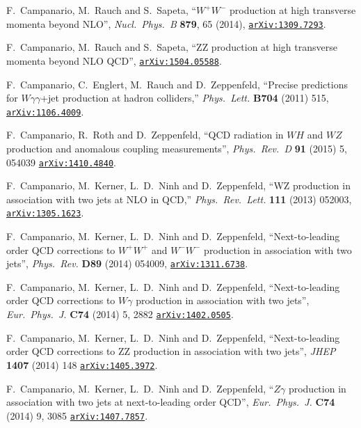 \documentclass[english,12pt]{article}
\begin{document}
\begin{thebibliography}{10}
  F.~Campanario, M.~Rauch and S.~Sapeta,
  ``$W^+W^-$ production at high transverse momenta beyond NLO'',
  {\em Nucl.\ Phys.\ B} {\bf 879}, 65 (2014),
\href{http://www.arXiv.org/abs/1309.7293}{{\tt arXiv:1309.7293}}.

  F.~Campanario, M.~Rauch and S.~Sapeta,
  ``ZZ production at high transverse momenta beyond NLO QCD'',
\href{http://www.arXiv.org/abs/1504.05588}{{\tt arXiv:1504.05588}}.

  F.~Campanario, C.~Englert, M.~Rauch and D.~Zeppenfeld,
  ``Precise predictions for $W \gamma \gamma$+jet production at hadron colliders,''
  {\em Phys.\ Lett.} {\bf B704} (2011) 515,
  \href{http://www.arXiv.org/abs/1106.4009}{{\tt arXiv:1106.4009}}.

  F.~Campanario, R.~Roth and D.~Zeppenfeld,
  ``QCD radiation in $WH$ and $WZ$ production and anomalous coupling measurements'',
  {\em Phys.\ Rev.\ D} {\bf 91} (2015) 5,  054039
  \href{http://www.arXiv.org/abs/1410.4840}{{\tt arXiv:1410.4840}}.
  
  F.~Campanario, M.~Kerner, L.~D.~Ninh and D.~Zeppenfeld,
  ``WZ production in association with two jets at NLO in QCD,''
  {\em Phys.\ Rev.\ Lett.} {\bf 111} (2013) 052003,
  \href{http://arXiv.org/abs/1305.1623} {{\tt arXiv:1305.1623}}.

  F.~Campanario, M.~Kerner, L.~D.~Ninh and D.~Zeppenfeld,
  ``Next-to-leading order QCD corrections to $W^+W^+$ and $W^-W^-$ production in association with two jets'',
  {\em Phys.\ Rev.} {\bf D89} (2014) 054009,
  \href{http://arXiv.org/abs/1311.6738} {{\tt arXiv:1311.6738}}.

  F.~Campanario, M.~Kerner, L.~D.~Ninh and D.~Zeppenfeld,
  ``Next-to-leading order QCD corrections to $W \gamma$ production in association with two jets'',
  {\em Eur.\ Phys.\ J.} {\bf C74} (2014) 5, 2882 
  \href{http://arXiv.org/abs/1402.0505} {{\tt arXiv:1402.0505}}.

  F.~Campanario, M.~Kerner, L.~D.~Ninh and D.~Zeppenfeld,
  ``Next-to-leading order QCD corrections to ZZ production in association with two jets'',
  {\em JHEP} {\bf 1407} (2014) 148 
  \href{http://arXiv.org/abs/1405.3972} {{\tt arXiv:1405.3972}}.

  F.~Campanario, M.~Kerner, L.~D.~Ninh and D.~Zeppenfeld,
  ``$Z\gamma$ production in association with two jets at next-to-leading order QCD'',
  {\em Eur.\ Phys.\ J.} {\bf C74} (2014) 9, 3085 
  \href{http://arXiv.org/abs/1407.7857} {{\tt arXiv:1407.7857}}.


\end{thebibliography}
\end{document}
